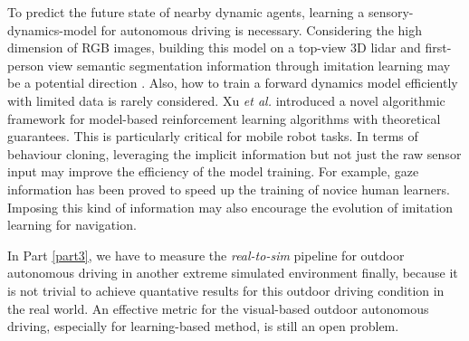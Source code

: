 To predict the future state of nearby dynamic agents, learning a sensory-dynamics-model for autonomous driving is necessary. Considering the high dimension of RGB images, building this model on a top-view 3D lidar and first-person view semantic segmentation information through imitation learning may be a potential direction \cite{Rhinehart_2018_ECCV, rhinehart2018deep}.
Also, how to train a forward dynamics model efficiently with limited data is rarely considered. Xu \textit{et al.} \cite{xu2018algorithmic} introduced a novel algorithmic framework for model-based reinforcement learning algorithms with theoretical guarantees. This is particularly critical for mobile robot tasks. In terms of behaviour cloning, leveraging the implicit information but not just the raw sensor input may improve the efficiency of the model training. For example, gaze information has been proved to speed up the training of novice human learners.
Imposing this kind of information \cite{chen2019gaze, liu2019gaze} may also encourage the evolution of imitation learning for navigation.

In Part \ref{part3}, we have to measure the \textit{real-to-sim} pipeline for outdoor autonomous driving in another extreme simulated environment finally, because it is not trivial to achieve quantative results for this outdoor driving condition in the real world. An effective metric for the visual-based outdoor autonomous driving, especially for learning-based method, is still an open problem.
